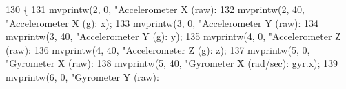\begin{DoxyCode}
130 \{
131         mvprintw(2, 0, \textcolor{stringliteral}{"Accelerometer X (raw): %
132         mvprintw(2, 40, \textcolor{stringliteral}{"Accelerometer X (g): %
      \hyperlink{structDATA__XYZ__DOUBLE_a22868cc99a423900e7b82d015a5eb91f}{x});
133         mvprintw(3, 0, \textcolor{stringliteral}{"Accelerometer Y (raw): %
134         mvprintw(3, 40, \textcolor{stringliteral}{"Accelerometer Y (g): %
      \hyperlink{structDATA__XYZ__DOUBLE_a198a27b5df3b5b0bf461b0e481e22a82}{y});
135         mvprintw(4, 0, \textcolor{stringliteral}{"Accelerometer Z (raw): %
136         mvprintw(4, 40, \textcolor{stringliteral}{"Accelerometer Z (g): %
      \hyperlink{structDATA__XYZ__DOUBLE_a9556e8868c223ff3e28756ea18a284c0}{z});
137         mvprintw(5, 0, \textcolor{stringliteral}{"Gyrometer X (raw):     %
138         mvprintw(5, 40, \textcolor{stringliteral}{"Gyrometer X (rad/sec):   %
      \hyperlink{structIMU__DATA__STRUCT_1_1calibrated_a8a54aded6ce608f1b7d2b4a0c52c248b}{gyr}.\hyperlink{structDATA__XYZ__DOUBLE_a22868cc99a423900e7b82d015a5eb91f}{x});
139         mvprintw(6, 0, \textcolor{stringliteral}{"Gyrometer Y (raw):     %
}}}}}}}}}
\end{DoxyCode}
